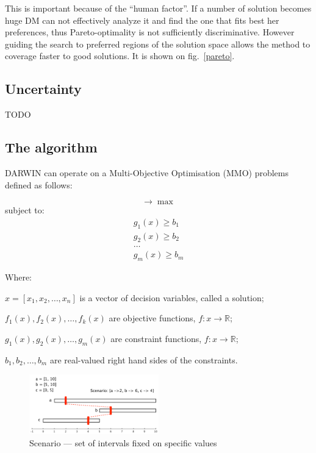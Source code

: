 This is important because of the ``human factor''. If a number of solution
becomes huge DM can not effectively analyze it and find the one that fits best
her preferences, thus Pareto-optimality is not sufficiently
discriminative. However guiding the search to preferred regions of the
solution space allows the method to coverage faster to good solutions. It is
shown on fig.~\ref{pareto}.


\subsection{Uncertainty}

TODO


\subsection{The algorithm}

DARWIN can operate on a Multi-Objective Optimisation (MMO) problems defined as
follows:

\begin{equation}
[ f_1(x), f_2(x), \dots, f_k(x) ] \rightarrow  \max
\end{equation}
subject to:
\begin{equation}
\begin{array}{l}
g_1(x) \geq b_1 \\
g_2(x) \geq b_2 \\
\dots \\
g_m(x) \geq b_m
\end{array}
\end{equation}

Where:
\begin{description}
\item $x = [x_1, x_2, \dots, x_n]$ is a vector of decision variables, called a
  solution;
\item $f_1(x), f_2(x), \dots, f_k(x)$ are objective functions,
  $f: x \rightarrow \mathbb{R}$;
\item $g_1(x), g_2(x), \dots, g_m(x)$ are constraint functions,
  $f: x \rightarrow \mathbb{R}$;
\item $b_1, b_2, \dots, b_m$ are real-valued right hand sides of the
  constraints.
\end{description}

\begin{figure}
  \centering \includegraphics[width=0.5\textwidth]{img/scenario}
  \caption{Scenario --- set of intervals fixed on specific values}
  \label{scenario}
\end{figure}

